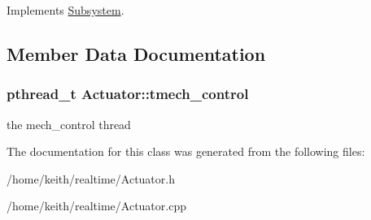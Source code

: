 Implements \hyperlink{classSubsystem_a510e18f972a3d86d7a47432dafa1ce4c}{Subsystem}.



\subsection{Member Data Documentation}
\hypertarget{classActuator_a0097e8667426ce3300ad60bdb6cd9d81}{
\subsubsection[{tmech\-\_\-control}]{\setlength{\rightskip}{0pt plus 5cm}pthread\-\_\-t Actuator\-::tmech\-\_\-control\hspace{0.3cm}{\ttfamily [protected]}}}\label{classActuator_a0097e8667426ce3300ad60bdb6cd9d81}
the mech\-\_\-control thread 

The documentation for this class was generated from the following files\-:\begin{DoxyCompactItemize}
\item 
/home/keith/realtime/Actuator.\-h\item 
/home/keith/realtime/Actuator.\-cpp\end{DoxyCompactItemize}
